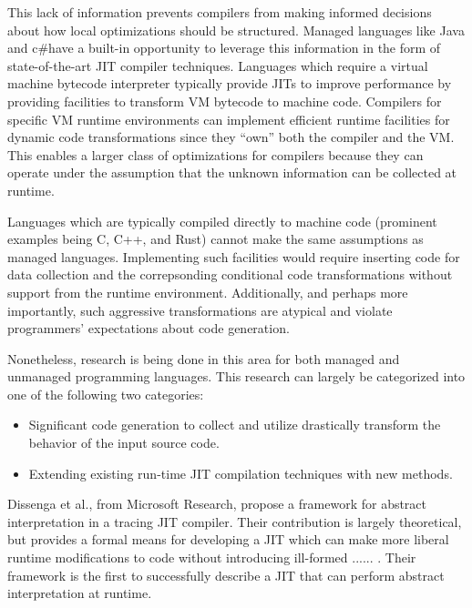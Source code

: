 \documentclass[nobib]{tufte-handout}
\makeatletter
\renewcommand{\subsubsection}{\ttl@straightclass{subsubsection}}
\newcommand{\csharp}{c\#}
\makeatother
\begin{document}
This lack of information prevents compilers from making informed decisions about how local optimizations should be structured.  Managed languages like Java and \csharp have a built-in opportunity to leverage this information in the form of state-of-the-art JIT compiler techniques.  Languages which require a virtual machine bytecode interpreter typically provide JITs to improve performance by providing facilities to transform VM bytecode to machine code.  Compilers for specific VM runtime environments can implement efficient runtime facilities for dynamic code transformations since they ``own'' both the compiler and the VM.  This enables a larger class of optimizations for compilers because they can operate under the assumption that the unknown information can be collected at runtime.

Languages which are typically compiled directly to machine code (prominent examples being C, C++, and Rust) cannot make the same assumptions as managed languages.  Implementing such facilities would require inserting code for data collection and the correpsonding conditional code transformations without support from the runtime environment.  Additionally, and perhaps more importantly, such aggressive transformations are atypical and violate programmers' expectations about code generation.  

Nonetheless, research is being done in this area for both managed and unmanaged programming languages.  This research can largely be categorized into one of the following two categories:
\begin{itemize}
\item Significant code generation to collect and utilize drastically transform the behavior of the input source code.
\item Extending existing run-time JIT compilation techniques with new methods.
\end{itemize}

\subsubsection{Innovations in JIT Compilers}
Dissenga et al., from Microsoft Research, propose a framework for abstract interpretation in a tracing JIT compiler.  Their contribution is largely theoretical, but provides a formal means for developing a JIT which can make more liberal runtime modifications to code without introducing ill-formed ...... .  Their framework is the first to successfully describe a JIT that can perform abstract interpretation at runtime.  
\end{document}
